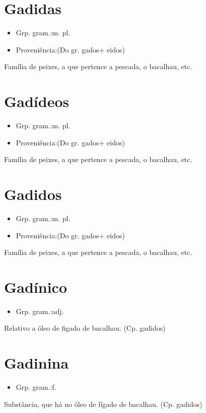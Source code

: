 \section{Gadidas}
\begin{itemize}
\item {Grp. gram.:m. pl.}
\end{itemize}
\begin{itemize}
\item {Proveniência:(Do gr. \textunderscore gados\textunderscore  + \textunderscore eidos\textunderscore )}
\end{itemize}
Família de peixes, a que pertence a pescada, o bacalhau, etc.
\section{Gadídeos}
\begin{itemize}
\item {Grp. gram.:m. pl.}
\end{itemize}
\begin{itemize}
\item {Proveniência:(Do gr. \textunderscore gados\textunderscore  + \textunderscore eidos\textunderscore )}
\end{itemize}
Família de peixes, a que pertence a pescada, o bacalhau, etc.
\section{Gadidos}
\begin{itemize}
\item {Grp. gram.:m. pl.}
\end{itemize}
\begin{itemize}
\item {Proveniência:(Do gr. \textunderscore gados\textunderscore  + \textunderscore eidos\textunderscore )}
\end{itemize}
Família de peixes, a que pertence a pescada, o bacalhau, etc.
\section{Gadínico}
\begin{itemize}
\item {Grp. gram.:adj.}
\end{itemize}
Relativo a óleo de figado de bacalhau.
(Cp. \textunderscore gadidos\textunderscore )
\section{Gadinina}
\begin{itemize}
\item {Grp. gram.:f.}
\end{itemize}
Substância, que há no óleo de fígado de bacalhau.
(Cp. \textunderscore gadidos\textunderscore )
